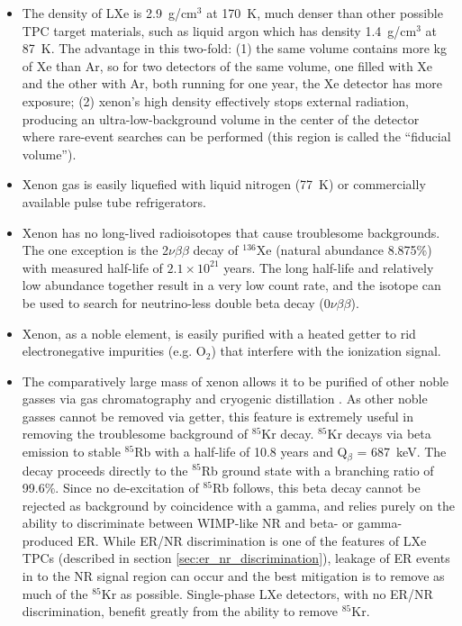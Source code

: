 \begin{itemize}
  \item The density of \ac{LXe} is 2.9~g/cm$^{3}$ at 170~K, much denser than other possible \ac{TPC} target materials, such as liquid argon which has density 1.4~g/cm$^{3}$ at 87~K. The advantage in this two-fold: (1) the same volume contains more kg of Xe than Ar, so for two detectors of the same volume, one filled with Xe and the other with Ar, both running for one year, the Xe detector has more exposure; (2) xenon's high density effectively stops external radiation, producing an ultra-low-background volume in the center of the detector where rare-event searches can be performed (this region is called the ``fiducial volume'').
  
  \item Xenon gas is easily liquefied with liquid nitrogen (77~K) or commercially available pulse tube refrigerators.

  \item Xenon has no long-lived radioisotopes that cause troublesome backgrounds. The one exception is the 2$\nu\beta\beta$ decay of $^{136}$Xe (natural abundance 8.875\%) with measured half-life of $2.1 \times 10^{21}$ years. The long half-life and relatively low abundance together result in a very low count rate, and the isotope can be used to search for neutrino-less double beta decay ($0\nu\beta\beta$).
  
  \item Xenon, as a noble element, is easily purified with a heated getter to rid electronegative impurities (e.g. O$_{2}$) that interfere with the ionization signal. 
  
  \item The comparatively large mass of xenon allows it to be purified of other noble gasses via gas chromatography \cite{LUXKrRemoval2018} and cryogenic distillation \cite{Xe1TKrRemoval2017}. As other noble gasses cannot be removed via getter, this feature is extremely useful in removing the troublesome background of $^{85}$Kr decay. $^{85}$Kr decays via beta emission to stable $^{85}$Rb with a half-life of 10.8 years and Q$_{\beta}$ = 687~keV. The decay proceeds directly to the $^{85}$Rb ground state with a branching ratio of 99.6\%. Since no de-excitation of $^{85}$Rb follows, this beta decay cannot be rejected as background by coincidence with a gamma, and relies purely on the ability to discriminate between WIMP-like \ac{NR} and beta- or gamma- produced \ac{ER}. While ER/NR discrimination is one of the features of \ac{LXe} \ac{TPC}s (described in section \ref{sec:er_nr_discrimination}), leakage of \ac{ER} events in to the \ac{NR} signal region can occur and the best mitigation is to remove as much of the  $^{85}$Kr as possible. Single-phase \ac{LXe} detectors, with no ER/NR discrimination, benefit greatly from the ability to remove $^{85}$Kr.
  

\end{itemize}
